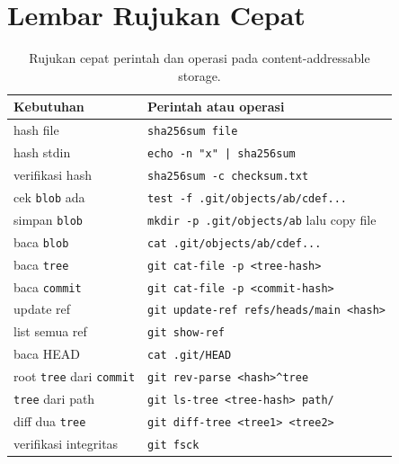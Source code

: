 \documentclass[11pt,a4paper]{article}
\begin{document}
\section{Lembar Rujukan Cepat}

\begin{table}[H]
	\centering
	\caption{Rujukan cepat perintah dan operasi pada content-addressable storage.}
	\label{tab:quick-reference}
	\footnotesize
	\begin{tabularx}{\textwidth}{l X}
		\toprule
		Kebutuhan                               & Perintah atau operasi                            \\
		\midrule
		hash file                               & \texttt{sha256sum file}                          \\
		hash stdin                              & \texttt{echo -n "x" | sha256sum}                 \\
		verifikasi hash                         & \texttt{sha256sum -c checksum.txt}               \\
		cek \texttt{blob} ada                   & \texttt{test -f .git/objects/ab/cdef...}         \\
		simpan \texttt{blob}                    & \texttt{mkdir -p .git/objects/ab} lalu copy file \\
		baca \texttt{blob}                      & \texttt{cat .git/objects/ab/cdef...}             \\
		baca \texttt{tree}                      & \texttt{git cat-file -p <tree-hash>}             \\
		baca \texttt{commit}                    & \texttt{git cat-file -p <commit-hash>}           \\
		update ref                              & \texttt{git update-ref refs/heads/main <hash>}   \\
		list semua ref                          & \texttt{git show-ref}                            \\
		baca HEAD                               & \texttt{cat .git/HEAD}                           \\
		root \texttt{tree} dari \texttt{commit} & \texttt{git rev-parse <hash>\^{}tree}            \\
		\texttt{tree} dari path                 & \texttt{git ls-tree <tree-hash> path/}           \\
		diff dua \texttt{tree}                  & \texttt{git diff-tree <tree1> <tree2>}           \\
		verifikasi integritas                   & \texttt{git fsck}                                \\

\end{tabularx}
\end{table}
\end{document}
